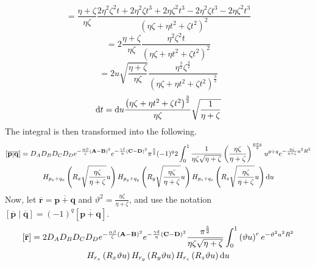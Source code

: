\begin{equation}
  = \frac{\eta + \zeta}{\eta\zeta} \frac{2\eta^2\zeta^2 t + 2\eta^2 \zeta t^3 + 2\eta \zeta^2 t^3 - 2\eta^2\zeta t^3 - 2\eta \zeta^2 t^3}{\left(\eta\zeta + \eta t^2 + \zeta t^2\right)^2}
\end{equation}
\begin{equation}
  = 2\frac{\eta + \zeta}{\eta\zeta} \frac{\eta^2\zeta^2 t}{\left(\eta\zeta + \eta t^2 + \zeta t^2\right)^2}
\end{equation}
\begin{equation}
  = 2u \sqrt{\frac{\eta + \zeta}{\eta\zeta}} \frac{\eta^{\frac{3}{2}}\zeta^{\frac{3}{2}}}{\left(\eta\zeta + \eta t^2 + \zeta t^2\right)^{\frac{3}{2}}}
\end{equation}
\begin{equation}
  \mathrm{d} t = \mathrm{d} u\frac{\left(\eta\zeta + \eta t^2 + \zeta t^2\right)^{\frac{3}{2}}}{\eta\zeta} \sqrt{\frac{1}{\eta + \zeta}}
\end{equation}
The integral is then transformed into the following.
\begin{multline}
  \left[\overline{\mathbf{p}}\middle|\overline{\mathbf{q}}\right] = D_A D_B D_C D_D e^{-\frac{\alpha\beta}{\zeta}\left(\mathbf{A} - \mathbf{B}\right)^2}e^{-\frac{\gamma\delta}{\eta}\left(\mathbf{C} - \mathbf{D}\right)^2}\pi^{\frac{5}{2}} (-1)^{q} 2\int_0^1 \frac{1}{\eta\zeta\sqrt{\eta + \zeta}}\left(\frac{\eta\zeta}{\eta + \zeta}\right)^{\frac{p + q}{2}} u^{p + q} e^{-\frac{\eta\zeta}{\eta + \zeta}u^2 R^2} \\
  H_{p_x + q_x}\left(R_x\sqrt{\frac{\eta\zeta}{\eta + \zeta}}u\right)H_{p_y + q_y}\left(R_y\sqrt{\frac{\eta\zeta}{\eta + \zeta}}u\right)H_{p_z + q_z}\left(R_z\sqrt{\frac{\eta\zeta}{\eta + \zeta}}u\right) \mathrm{d} u
\end{multline}
Now, let $\overline{\mathbf{r}} = \overline{\mathbf{p} + \mathbf{q}}$ and $\vartheta^2 = \frac{\eta\zeta}{\eta + \zeta}$, and use the notation $\left[\overline{\mathbf{p}}\middle|\overline{\mathbf{q}}\right] = (-1)^q \left[\overline{\mathbf{p} + \mathbf{q}}\right]$.
\begin{multline}
  \left[\overline{\mathbf{r}}\right] = 2D_A D_B D_C D_D e^{-\frac{\alpha\beta}{\zeta}\left(\mathbf{A} - \mathbf{B}\right)^2}e^{-\frac{\gamma\delta}{\eta}\left(\mathbf{C} - \mathbf{D}\right)^2}\frac{\pi^{\frac{5}{2}}}{\eta\zeta\sqrt{\eta + \zeta}} \int_0^1 \left(\vartheta u\right)^r e^{-\vartheta^2 u^2 R^2} \\
  H_{r_x}\left(R_x\vartheta u\right) H_{r_y}\left(R_y\vartheta u\right) H_{r_z}\left(R_z\vartheta u\right) \mathrm{d} u
\end{multline}
